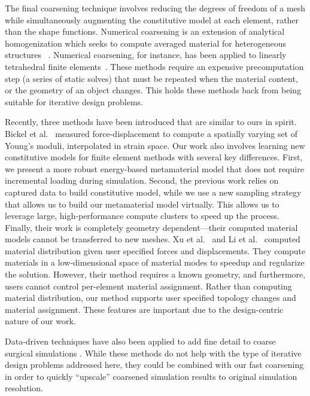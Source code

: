 The final coarsening technique involves reducing the degrees of freedom of a mesh while simultaneously augmenting the constitutive model at each element, rather than the shape functions.
Numerical coarsening is an extension of analytical homogenization which seeks to compute averaged material for heterogeneous structures ~\cite{guedes1990,farmer2002}.
Numerical coarsening, for instance, has been applied to linearly tetrahedral finite elements~\cite{Kharevych2009}.
These methods require an expensive precomputation step (a series of static solves) that must be repeated when the material content, or the geometry of an object changes.
This holds these methods back from being suitable for iterative design problems. 

Recently, three methods have been introduced that are similar to ours in spirit.
Bickel et al.~\cite{Bickel2009} measured force-displacement to compute a spatially varying set of Young's moduli, interpolated in strain space.
Our work also involves learning new constitutive models for finite element methods with several key differences.
First, we present a more robust energy-based metamaterial model that does not require incremental loading during simulation.
Second, the previous work relies on captured data to build constitutive model, while we use a new sampling strategy that allows us to build our metamaterial model virtually.
This allows us to leverage large, high-performance compute clusters to speed up the process.
Finally, their work is completely geometry dependent---their computed material models cannot be transferred to new meshes.
Xu et al.~\cite{Xu2014} and Li et al.~\cite{Li2014} computed material distribution given user specified forces and displacements.
	They compute materials in a low-dimensional space of material modes to speedup and regularize the solution.
	However, their method requires a known geometry, and furthermore,
	users cannot control per-element material assignment.
	Rather than computing material distribution,
	our method supports user specified topology changes and material assignment.
	These features are important due to the design-centric nature of our work.

Data-driven techniques have also been applied to add fine detail to coarse surgical simulations \cite{Cotin1999,Kavan:2011,Seiler2012}. While these methods do not help with the type of iterative design problems addressed here, they could be combined with our fast coarsening in order to quickly ``upscale'' coarsened simulation results to original simulation resolution.